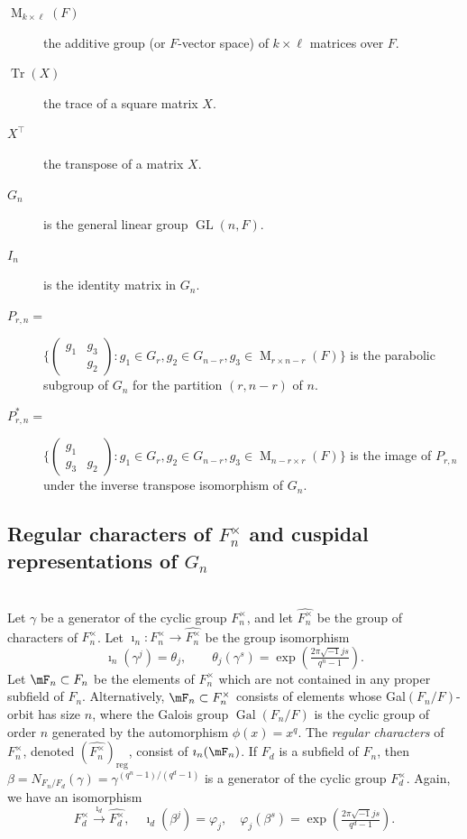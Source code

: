 \documentclass[reqno]{amsart}
\theoremstyle{definition}
\theoremstyle{remark}
\numberwithin{equation}{section}
\DeclareMathOperator{\GL}{GL}
\DeclareMathOperator{\Gal}{Gal}
\DeclareMathOperator{\M}{M}
\DeclareMathOperator{\tr}{Tr}
\newcommand{\bbsm}{\left (\begin{smallmatrix}}      \newcommand{\besm}{\end{smallmatrix}\right )}
\begin{document}
\begin{description}
\item[$\M_{k \times \ell}(F)$] the additive group (or $F$-vector space)  of $k \times \ell$ matrices over $F$.
\item[$\tr(X)$] the trace of a square matrix $X$.
\item[$X^\top$] the transpose  of a  matrix $X$.
\item [$G_n$] is the general linear group $\GL(n,F)$.
\item [$I_n$] is the identity matrix in $G_n$.
\item [$P_{r,n}=$] $\{ \bbsm g_1 & g_3\\& g_2 \besm \colon g_1 \in G_r, g_2 \in G_{n-r}, g_3 \in \M_{r \times n-r}(F)\}$ is the parabolic subgroup of $G_n$ for the partition $(r,n-r)$ of $n$.
\item [$P_{r,n}^*=$] $\{ \bbsm g_1 & \\g_3 & g_2 \besm \colon g_1 \in G_r, g_2 \in G_{n-r}, g_3 \in \M_{n-r \times r}(F)\}$ is the image of $P_{r,n}$ under the inverse transpose isomorphism of $G_n$.
\end{description}
\subsection{Regular characters of $F_n^\times$ and cuspidal representations of $G_n$} \hfill \\
Let $\gamma$ be  a generator of the cyclic group $F_n^\times$, and let $\widehat{F_n^\times}$ be the group of characters of $F_n^\times$. Let  $\imath_n \colon F_n^\times \to \widehat{F_n^\times}$ be the group isomorphism 
\[ \imath_n(\gamma^j) = \theta_j, \qquad \theta_j(\gamma^s)=\exp(\tfrac{2 \pi \sqrt{-1}  j s}{q^n-1}).\]
Let $\mF_n \subset F_n$ be the elements of $F_n^\times$ which are not contained in any proper subfield of $F_n$. Alternatively, $\mF_n\subset F_n^\times$ consists of elements whose Gal$(F_n/F)$-orbit has size $n$, where 
the Galois group $\Gal(F_n/F)$ is the cyclic group of order $n$ generated by the automorphism $\phi(x)=x^q$.  The \emph{regular characters} of $F_n^\times$,  denoted $(\widehat{F_n^\times})_{\text{reg}}$,  consist of $\imath_n(\mF_n)$. If $F_d$ is a subfield of $F_n$, then $\beta=N_{F_n/F_d}(\gamma) = \gamma^{(q^n-1)/(q^d-1)}$ is a generator of the cyclic group $F_d^\times$. Again, we have an isomorphism
\[ F_d^\times \xrightarrow{\imath_d}  \widehat{F_d^\times}, \quad \imath_d(\beta^j)=\varphi_j, \quad \varphi_j(\beta^s)=\exp(\tfrac{2 \pi \sqrt{-1}  j s}{q^d-1}). \]
 
\end{document}
